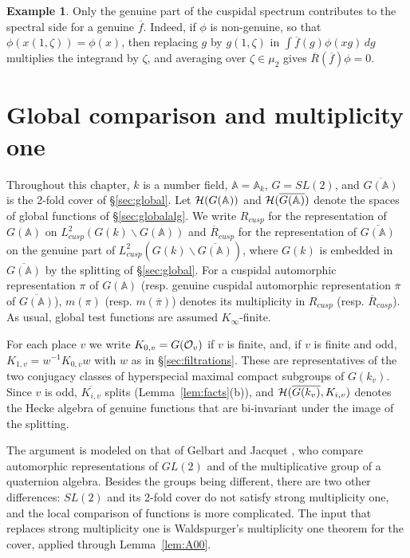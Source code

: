 \documentclass[12pt,letterpaper]{book}
\theoremstyle{plain}
\theoremstyle{definition}
\newtheorem{example}[theorem]{Example}
\theoremstyle{remark}
\theoremstyle{remark}
\begin{document}
\begin{example}
Only the genuine part of the cuspidal spectrum contributes to the
spectral side for a genuine $\overline f$. Indeed, if $\phi$ is
non-genuine, so that $\phi(x(1,\zeta))=\phi(x)$, then replacing $g$ by
$g(1,\zeta)$ in $\int\overline f(g)\phi(xg)\,dg$ multiplies the integrand by
$\zeta$, and averaging over $\zeta\in\mu_2$ gives
$\overline R(\overline f)\phi=0$.
\end{example}

\chapter{Global comparison and multiplicity one}\label{ch:global}

Throughout this chapter, $k$ is a number field, ${\mathbb{A}}={\mathbb{A}}_k$,
$G=SL(2)$, and $\overline{G({\mathbb{A}})}$ is the 2-fold cover of
\S\ref{sec:global}. Let ${\cal H}(G({\mathbb{A}}))$ and
${\cal H}(\overline{G({\mathbb{A}})})$ denote the spaces of global
functions of \S\ref{sec:globalalg}. We write $R_{cusp}$ for the
representation of $G({\mathbb{A}})$ on
$L^2_{cusp}(G(k)\backslash G({\mathbb{A}}))$ and $\overline{R}_{cusp}$ for
the representation of $\overline{G({\mathbb{A}})}$ on the genuine part of
$L^2_{cusp}(G(k)\backslash \overline{G({\mathbb{A}})})$, where $G(k)$ is
embedded in $\overline{G({\mathbb{A}})}$ by the splitting of
\S\ref{sec:global}. For a cuspidal automorphic representation $\pi$ of
$G({\mathbb{A}})$ (resp. genuine cuspidal automorphic representation
$\overline{\pi}$ of $\overline{G({\mathbb{A}})}$), $m(\pi)$ (resp.
$m(\overline{\pi})$) denotes its multiplicity in $R_{cusp}$ (resp.
$\overline{R}_{cusp}$). As usual, global test functions are assumed
$K_\infty$-finite.

For each place $v$ we write $K_{0,v}=G({\cal O}_v)$ if $v$ is finite,
and, if $v$ is finite and odd, $K_{1,v}=w^{-1}K_{0,v}w$ with $w$ as in
\S\ref{sec:filtrations}. These are representatives of the two conjugacy
classes of hyperspecial maximal compact subgroups of $G(k_v)$. Since $v$
is odd, $\overline{K_{i,v}}$ splits (Lemma~\ref{lem:facts}(b)), and
${\cal H}(\overline{G(k_v)},K_{i,v})$ denotes the Hecke algebra of
genuine functions that are bi-invariant under the image of the
splitting.

The argument is modeled on that of Gelbart and Jacquet \cite{GJ}, who
compare automorphic representations of $GL(2)$ and of the multiplicative
group of a quaternion algebra. Besides the groups being different, there
are two other differences: $SL(2)$ and its 2-fold cover do not satisfy
strong multiplicity one, and the local comparison of functions is more
complicated. The input that replaces strong multiplicity one is
Waldspurger's multiplicity one theorem for the cover, applied through
Lemma~\ref{lem:A00}.
\end{document}
